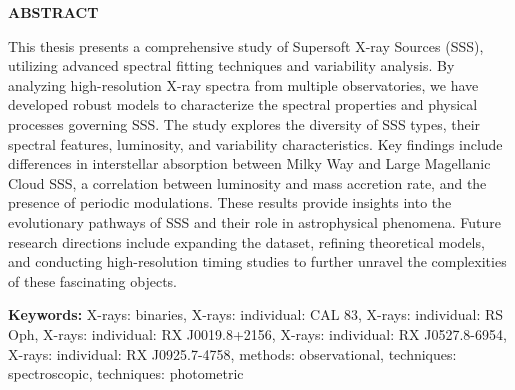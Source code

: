 \begin{titlepage}
    \begin{center}
        {\Large \Large \bf {ABSTRACT} }
    \end{center}
    
    This thesis presents a comprehensive study of Supersoft X-ray Sources (SSS), utilizing advanced spectral fitting techniques and variability analysis. By analyzing high-resolution X-ray spectra from multiple observatories, we have developed robust models to characterize the spectral properties and physical processes governing SSS. The study explores the diversity of SSS types, their spectral features, luminosity, and variability characteristics. Key findings include differences in interstellar absorption between Milky Way and Large Magellanic Cloud SSS, a correlation between luminosity and mass accretion rate, and the presence of periodic modulations. These results provide insights into the evolutionary pathways of SSS and their role in astrophysical phenomena. Future research directions include expanding the dataset, refining theoretical models, and conducting high-resolution timing studies to further unravel the complexities of these fascinating objects.
    
    \textbf{Keywords:} X-rays: binaries, X-rays: individual: CAL 83, X-rays: individual: RS Oph, X-rays: individual: RX J0019.8+2156, X-rays: individual: RX J0527.8-6954, X-rays: individual: RX J0925.7-4758, methods: observational, techniques: spectroscopic, techniques: photometric

\end{titlepage}

